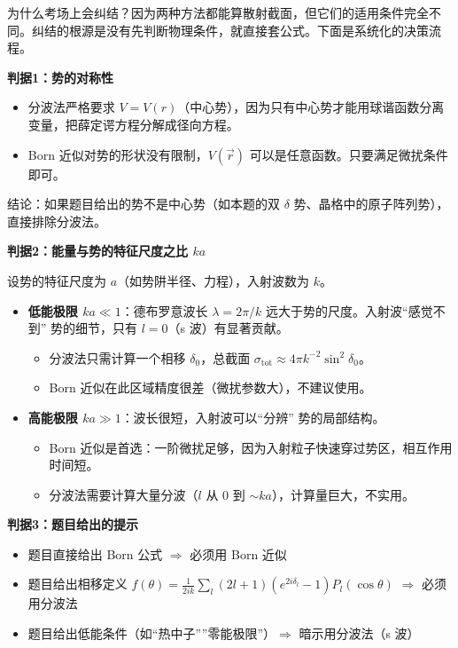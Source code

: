 \begin{derivationbox}

为什么考场上会纠结？因为两种方法都能算散射截面，但它们的适用条件完全不同。纠结的根源是没有先判断物理条件，就直接套公式。下面是系统化的决策流程。

\textbf{判据1：势的对称性}
\begin{itemize}
    \item 分波法严格要求 $V = V(r)$（中心势），因为只有中心势才能用球谐函数分离变量，把薛定谔方程分解成径向方程。
    \item Born 近似对势的形状没有限制，$V(\vec{r})$ 可以是任意函数。只要满足微扰条件即可。
\end{itemize}
结论：如果题目给出的势不是中心势（如本题的双 $\delta$ 势、晶格中的原子阵列势），直接排除分波法。

\textbf{判据2：能量与势的特征尺度之比 $ka$}

设势的特征尺度为 $a$（如势阱半径、力程），入射波数为 $k$。
\begin{itemize}
    \item \textbf{低能极限 $ka \ll 1$}：德布罗意波长 $\lambda = 2\pi/k$ 远大于势的尺度。入射波``感觉不到'' 势的细节，只有 $l = 0$（s 波）有显著贡献。
    \begin{itemize}
        \item 分波法只需计算一个相移 $\delta_0$，总截面 $\sigma_{\text{tot}} \approx 4\pi k^{-2} \sin^2\delta_0$。
        \item Born 近似在此区域精度很差（微扰参数大），不建议使用。
    \end{itemize}
    \item \textbf{高能极限 $ka \gg 1$}：波长很短，入射波可以``分辨'' 势的局部结构。
    \begin{itemize}
        \item Born 近似是首选：一阶微扰足够，因为入射粒子快速穿过势区，相互作用时间短。
        \item 分波法需要计算大量分波（$l$ 从 $0$ 到 $\sim ka$），计算量巨大，不实用。
    \end{itemize}
\end{itemize}

\textbf{判据3：题目给出的提示}
\begin{itemize}
    \item 题目直接给出 Born 公式 $\Rightarrow$ 必须用 Born 近似
    \item 题目给出相移定义 $f(\theta) = \frac{1}{2ik}\sum_l (2l+1)(e^{2i\delta_l}-1)P_l(\cos\theta)$ $\Rightarrow$ 必须用分波法
    \item 题目给出低能条件（如``热中子''''零能极限''）$\Rightarrow$ 暗示用分波法（s 波）
\end{itemize}


\end{derivationbox}
